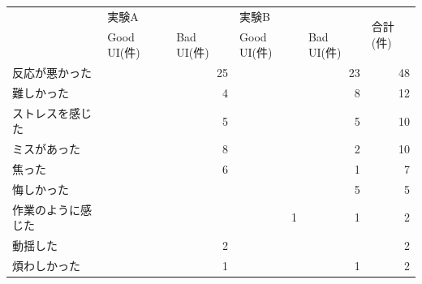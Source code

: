 \begin{table}[htbp]
\centering
\begin{tabular}{lrrrrr}
\hline
             & \multicolumn{1}{l}{実験A}     & \multicolumn{1}{l}{}       & \multicolumn{1}{l}{実験B}     & \multicolumn{1}{l}{}       & \multicolumn{1}{l}{\multirow{2}{*}{合計(件)}} \\ \cline{2-5}
             & \multicolumn{1}{l}{Good UI(件)} & \multicolumn{1}{l}{Bad UI(件)} & \multicolumn{1}{l}{Good UI(件)} & \multicolumn{1}{l}{Bad UI(件)} & \multicolumn{1}{l}{}                    \\ \hline
反応が悪かった      &                             & 25                         &                             & 23                         & 48                                      \\
難しかった        &                             & 4                          &                             & 8                          & 12                                      \\
ストレスを感じた     &                             & 5                          &                             & 5                          & 10                                      \\
ミスがあった       &                             & 8                          &                             & 2                          & 10                                      \\
焦った          &                             & 6                          &                             & 1                          & 7                                       \\
悔しかった        &                             &                            &                             & 5                          & 5                                       \\
作業のように感じた    &                             &                            & 1                           & 1                          & 2                                       \\
動揺した         &                             & 2                          &                             &                            & 2                                       \\
煩わしかった       &                             & 1                          &                             & 1                          & 2                                       \\

\end{tabular}
\end{table}
